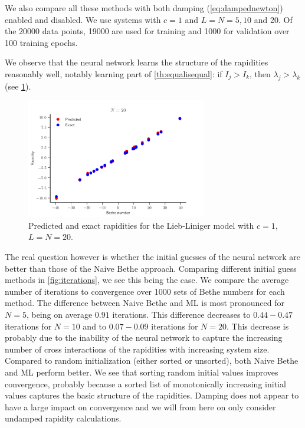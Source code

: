 \documentclass[11pt, a4paper]{report} %
\begin{document}
We also compare all these methods with both damping (\cref{eq:dampednewton}) enabled and disabled. We use systems with \(c=1\) and \(L=N=5,10\) and 20.
Of the 20000 data points, 19000 are used for training and 1000 for validation over 100 training epochs.

We observe that the neural network learns the structure of the rapidities reasonably well, notably learning part of \cref{th:equalisequal}: if \(I_j >I_k\), then \(\lambda_j > \lambda_k\) (see \cref{fig:rapidities}).

\begin{figure}[tb!]
  \centering
  \includegraphics[width=0.70\textwidth]{rapidities_20.pdf}
  \caption{Predicted and exact rapidities for the Lieb-Liniger model with \(c=1\), \(L=N=20\).}
  \label{fig:rapidities}
\end{figure}

The real question however is whether the initial guesses of the neural network are better than those of the Naive Bethe approach.
Comparing different initial guess methods in \cref{fig:iterations}, we see this being the case.
We compare the average number of iterations to convergence over 1000 sets of Bethe numbers for each method.
The difference between Naive Bethe and ML is most pronounced for \(N=5\), being on average \(0.91\) iterations.
This difference decreases to \(0.44-0.47\) iterations for \(N=10\) and to \(0.07-0.09\) iterations for \(N=20\).
This decrease is probably due to the inability of the neural network to capture the increasing number of cross interactions of the rapidities with increasing system size.
Compared to random initialization (either sorted or unsorted), both Naive Bethe and ML perform better.
We see that sorting random initial values improves convergence, probably because a sorted list of monotonically increasing initial values captures the basic structure of the rapidities.
Damping does not appear to have a large impact on convergence and we will from here on only consider undamped rapidity calculations.
\end{document}
